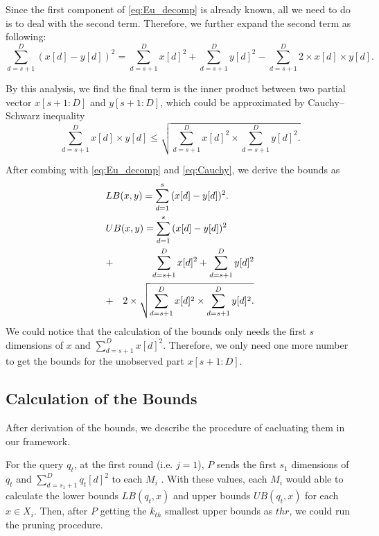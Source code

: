 Since the first component of \eqref{eq:Eu_decomp} is already known, all we need to do is to deal with the second term. Therefore, we further expand the second term as following:
\[
\sum^D_{d=s+1}{(x[d]-y[d])^2}=\sum^D_{d=s+1}{x[d]^2}+\sum^D_{d=s+1}{y[d]^2}-\sum^D_{d=s+1}{2\times x[d]\times y[d].}
\]

By this analysis, we find the final term is the inner product between two partial vector $x[s+1:D]$ and $y[s+1:D]$, which could be approximated by Cauchy–Schwarz inequality
\begin{equation}\label{eq:Cauchy}
	\sum^D_{d=s+1}{x[d]\times y[d]} \leq \sqrt{\sum^D_{d=s+1}{x[d]^2}\times \sum^D_{d=s+1}{y[d]^2}.}
\end{equation}

After combing with \eqref{eq:Eu_decomp} and \eqref{eq:Cauchy}, we derive the bounds as 
{
\begin{eqnarray}
\lefteqn{LB(x,y) = \sum^s_{d=1}{(x[d]-y[d])^2}.} \label{eq:single-LB} \\
\lefteqn{UB(x,y) = \sum^s_{d=1}{(x[d]-y[d])^2}} \notag \\
& + & \sum^D_{d=s+1}{x[d]^2}+\sum^D_{d=s+1}{y[d]^2} \notag \\
& + & 2 \times \sqrt{\sum^D_{d=s+1}{x[d]^2}\times \sum^D_{d=s+1}{y[d]^2}.}\label{eq:single-UB}
\end{eqnarray}
}
We could notice that the calculation of the bounds only needs the first $s$ dimensions of $x$ and $\sum^D_{d=s+1}{x[d]^2}$.  Therefore, we only need one more number to get the bounds for the unobserved part $x[s+1:D]$.


\subsection{Calculation of the Bounds} %
\label{sub:calculation_the_bounds}
After derivation of the bounds, we describe the procedure of cacluating them in our framework.  

For the query $q_t$, at the first round (i.e. $j=1$), $P$ sends the first $s_1$ dimensions of $q_t$ and $\sum^D_{d=s_1+1}{q_t[d]}^2$ to each $M_i$ .  With these values, each $M_i$ would able to calculate the lower bounds $LB(q_t,x)$ and upper bounds $UB(q_t,x)$ for each $x\in X_i$.  Then, after $P$ getting the $k_{th}$ smallest upper bounds as $thr$, we could run the pruning procedure.

